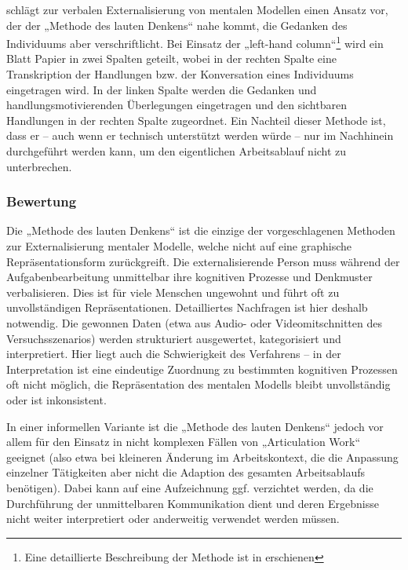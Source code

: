 \citet{Senge90} schlägt zur verbalen Externalisierung von mentalen Modellen einen Ansatz vor, der der „Methode des lauten Denkens“ nahe kommt, die Gedanken des Individuums aber verschriftlicht. Bei Einsatz der „left-hand column“\footnote{Eine detaillierte Beschreibung der Methode ist in \citep{Senge94} erschienen} wird ein Blatt Papier in zwei Spalten geteilt, wobei in der rechten Spalte eine Transkription der Handlungen bzw. der Konversation eines Individuums eingetragen wird. In der linken Spalte werden die Gedanken und handlungsmotivierenden Überlegungen eingetragen und den sichtbaren Handlungen in der rechten Spalte zugeordnet. Ein Nachteil dieser Methode ist, dass er -- auch wenn er technisch unterstützt werden würde -- nur im Nachhinein durchgeführt werden kann, um den eigentlichen Arbeitsablauf nicht zu unterbrechen.

\subsubsection{Bewertung}

Die „Methode des lauten Denkens“ \citep{Van-Someren94} ist die einzige der vorgeschlagenen Methoden zur Externalisierung mentaler Modelle, welche nicht auf eine graphische Repräsentationsform zurückgreift. Die externalisierende Person muss während der Aufgabenbearbeitung unmittelbar ihre kognitiven Prozesse und Denkmuster verbalisieren. Dies ist für viele Menschen ungewohnt und führt oft zu unvollständigen Repräsentationen. Detailliertes Nachfragen ist hier deshalb notwendig. Die gewonnen Daten (etwa aus Audio- oder Videomitschnitten des Versuchsszenarios) werden strukturiert ausgewertet, kategorisiert und interpretiert. Hier liegt auch die Schwierigkeit des Verfahrens -- in der Interpretation ist eine eindeutige Zuordnung zu bestimmten kognitiven Prozessen oft nicht möglich, die Repräsentation des mentalen Modells bleibt unvollständig oder ist inkonsistent. \citep[][S. 28]{Ifenthaler06}

In einer informellen Variante ist die „Methode des lauten Denkens“ jedoch vor allem für den Einsatz in nicht komplexen Fällen von „Articulation Work“ geeignet (also etwa bei kleineren Änderung im Arbeitskontext, die die Anpassung einzelner Tätigkeiten aber nicht die Adaption des gesamten Arbeitsablaufs benötigen). Dabei kann auf eine Aufzeichnung ggf. verzichtet werden, da die Durchführung der unmittelbaren Kommunikation dient und deren Ergebnisse nicht weiter interpretiert oder anderweitig verwendet werden müssen.

